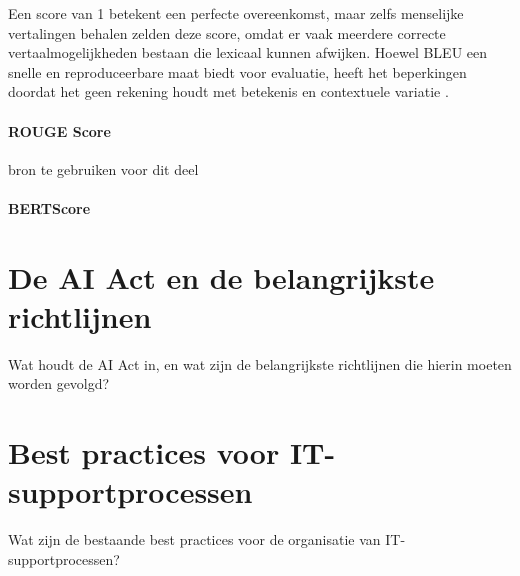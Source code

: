     Een score van 1 betekent een perfecte overeenkomst, maar zelfs menselijke vertalingen behalen zelden deze score, omdat er vaak meerdere correcte vertaalmogelijkheden bestaan die lexicaal kunnen afwijken. Hoewel BLEU een snelle en reproduceerbare maat biedt voor evaluatie, heeft het beperkingen doordat het geen rekening houdt met betekenis en contextuele variatie \cite{papineni-etal-2002-bleu}.
    
    \paragraph{ROUGE Score}
    
    bron te gebruiken voor dit deel \textcite{Ganesan2018}
    
    \paragraph{BERTScore}

\section{De AI Act en de belangrijkste richtlijnen}
Wat houdt de AI Act in, en wat zijn de belangrijkste richtlijnen die hierin moeten worden gevolgd?

\section{Best practices voor IT-supportprocessen}
Wat zijn de bestaande best practices voor de organisatie van IT-supportprocessen?
